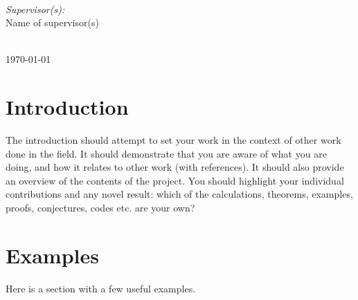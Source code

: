 \documentclass[a4paper,11pt, titlepage]{article}
\theoremstyle{definition}
\theoremstyle{plain}
\theoremstyle{remark}
\newcommand{\supervisor}{Name of supervisor(s)} %
\begin{document}
\begin{titlepage}
~
\begin{minipage}{0.4\textwidth}
\begin{flushright} \large
\emph{Supervisor(s):} \\
\supervisor %
\end{flushright}
\end{minipage}\\[2cm]
\makeatother
\vfill
\makeatletter
{\large \today}\\[2cm] %
\makeatother
\end{titlepage}

\begin{abstract}
Type your abstract here. The abstract is a summary of the contents of the project. It should be brief but informative, and
should avoid technicalities as far as possible.
\end{abstract}
 
\tableofcontents
\clearpage

\section{Introduction}
\label{sec:introduction}

The introduction should attempt to set your work in the context of other work done in the field. It
should demonstrate that you are aware of what you are doing, and how it relates to other work
(with references). It should also provide an overview of the contents of the project. You should
highlight your individual contributions and any novel result: which of the calculations, theorems,
examples, proofs, conjectures, codes etc. are your own?

\section{Examples}

Here is a section with a few useful examples. 
\end{document}
